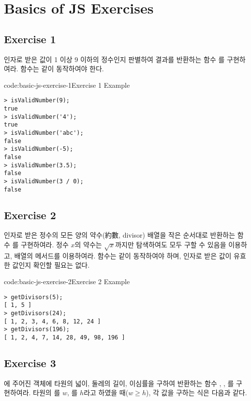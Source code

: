 \section{Basics of JS Exercises} \label{sect:basic-js-exercises}

\subsection*{Exercise 1}
인자로 받은 값이 1 이상 9 이하의 정수인지 판별하여 결과를 반환하는 함수 를 구현하여라.  함수는 \과 같이 동작하여야 한다.

\begin{codeenv}{code:basic-js-exercise-1}{Exercise 1 Example}\begin{verbatim}
> isValidNumber(9);
true
> isValidNumber('4');
true
> isValidNumber('abc');
false
> isValidNumber(-5);
false
> isValidNumber(3.5);
false
> isValidNumber(3 / 0);
false
\end{verbatim}
\end{codeenv}

\subsection*{Exercise 2}
인자로 받은 정수의 모든 양의 약수(約數, divisor) 배열을 작은 순서대로 반환하는 함수 를 구현하여라. 정수 $x$의 약수는 $\sqrt{x}$까지만 탐색하여도 모두 구할 수 있음을 이용하고, 배열의  메서드를 이용하여라.  함수는 \와 같이 동작하여야 하며, 인자로 받은 값이 유효한 값인지 확인할 필요는 없다.

\begin{codeenv}{code:basic-js-exercise-2}{Exercise 2 Example}\begin{verbatim}
> getDivisors(5);
[ 1, 5 ]
> getDivisors(24);
[ 1, 2, 3, 4, 6, 8, 12, 24 ]
> getDivisors(196);
[ 1, 2, 4, 7, 14, 28, 49, 98, 196 ]
\end{verbatim}
\end{codeenv}


\subsection*{Exercise 3}
에 주어진  객체에 타원의 넓이, 둘레의 길이, 이심률을 구하여 반환하는 함수 , , 를 구현하여라. 타원의 를 $w$, 를 $h$라고 하였을 때($w \geq h$), 각 값을 구하는 식은 다음과 같다.


